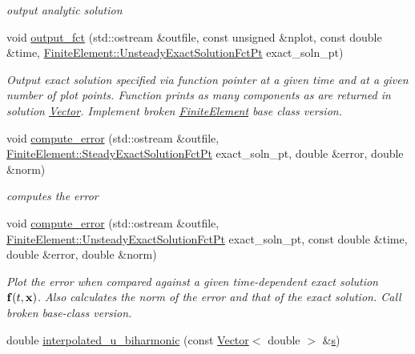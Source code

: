 \begin{DoxyCompactItemize}
\begin{DoxyCompactList}\small\item\em output analytic solution \end{DoxyCompactList}\item 
void \hyperlink{classoomph_1_1BiharmonicEquations_a4899086db9350750d873a076a75d150d}{output\+\_\+fct} (std\+::ostream \&outfile, const unsigned \&nplot, const double \&time, \hyperlink{classoomph_1_1FiniteElement_ad4ecf2b61b158a4b4d351a60d23c633e}{Finite\+Element\+::\+Unsteady\+Exact\+Solution\+Fct\+Pt} exact\+\_\+soln\+\_\+pt)
\begin{DoxyCompactList}\small\item\em Output exact solution specified via function pointer at a given time and at a given number of plot points. Function prints as many components as are returned in solution \hyperlink{classoomph_1_1Vector}{Vector}. Implement broken \hyperlink{classoomph_1_1FiniteElement}{Finite\+Element} base class version. \end{DoxyCompactList}\item 
void \hyperlink{classoomph_1_1BiharmonicEquations_a914c46acc12aeea7d4b6288eceef1b5b}{compute\+\_\+error} (std\+::ostream \&outfile, \hyperlink{classoomph_1_1FiniteElement_a690fd33af26cc3e84f39bba6d5a85202}{Finite\+Element\+::\+Steady\+Exact\+Solution\+Fct\+Pt} exact\+\_\+soln\+\_\+pt, double \&error, double \&norm)
\begin{DoxyCompactList}\small\item\em computes the error \end{DoxyCompactList}\item 
void \hyperlink{classoomph_1_1BiharmonicEquations_a33e635f29e497c978a68bf5094391038}{compute\+\_\+error} (std\+::ostream \&outfile, \hyperlink{classoomph_1_1FiniteElement_ad4ecf2b61b158a4b4d351a60d23c633e}{Finite\+Element\+::\+Unsteady\+Exact\+Solution\+Fct\+Pt} exact\+\_\+soln\+\_\+pt, const double \&time, double \&error, double \&norm)
\begin{DoxyCompactList}\small\item\em Plot the error when compared against a given time-\/dependent exact solution $ {\bf f}(t,{\bf x}) $. Also calculates the norm of the error and that of the exact solution. Call broken base-\/class version. \end{DoxyCompactList}\item 
double \hyperlink{classoomph_1_1BiharmonicEquations_ac0fddc16dbe7c8bbfeea76beeba88e46}{interpolated\+\_\+u\+\_\+biharmonic} (const \hyperlink{classoomph_1_1Vector}{Vector}$<$ double $>$ \&\hyperlink{cfortran_8h_ab7123126e4885ef647dd9c6e3807a21c}{s})

\end{DoxyCompactItemize}
